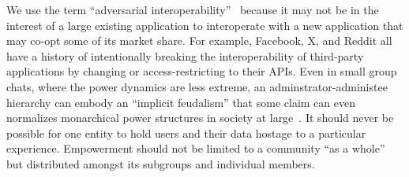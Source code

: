 
We use the term ``adversarial interoperability''~\cite{adversarialinterop} because it may not be in the
interest of a large existing application to interoperate with a new application that may co-opt some of its market share.
For example, Facebook, X, and Reddit all have a history of intentionally breaking
the interoperability of third-party applications by changing or access-restricting to their APIs.
Even in small group chats, where the power dynamics are less extreme,
an adminstrator-administee hierarchy
can embody an ``implicit feudalism'' that some claim can even
normalizes monarchical power structures in society at large~\cite{governablespaces}.
It should never be possible for one entity to hold users
and their data hostage to a particular experience.
Empowerment should not be limited to a community ``as a whole'' but
distributed amongst its subgroups and individual members.









